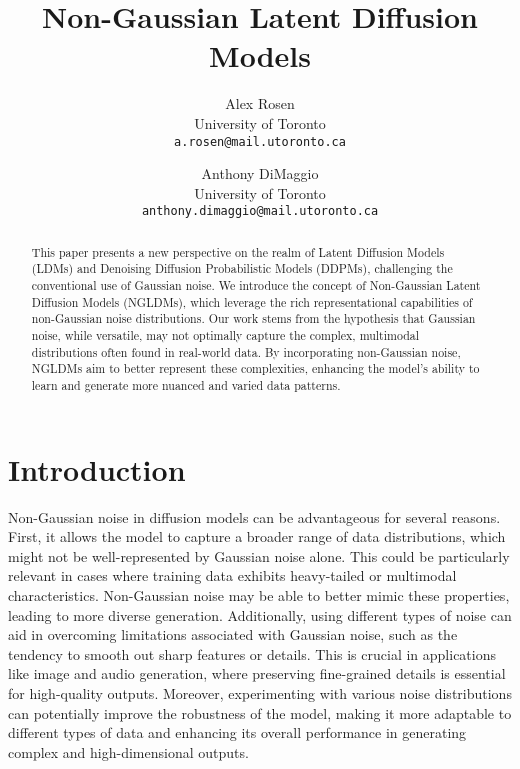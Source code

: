 \documentclass[10pt,twocolumn,letterpaper]{article}
\begin{document}
\title{Non-Gaussian Latent Diffusion Models}

\author{Alex Rosen\\
University of Toronto\\
{\tt\small a.rosen@mail.utoronto.ca}
\and
Anthony DiMaggio\\
University of Toronto\\
{\tt\small anthony.dimaggio@mail.utoronto.ca}
}
\maketitle

\begin{abstract}
   This paper presents a new perspective on the realm of Latent Diffusion Models (LDMs) and Denoising Diffusion Probabilistic Models (DDPMs), challenging the conventional use of Gaussian noise. We introduce the concept of Non-Gaussian Latent Diffusion Models (NGLDMs), which leverage the rich representational capabilities of non-Gaussian noise distributions. Our work stems from the hypothesis that Gaussian noise, while versatile, may not optimally capture the complex, multimodal distributions often found in real-world data. By incorporating non-Gaussian noise, NGLDMs aim to better represent these complexities, enhancing the model's ability to learn and generate more nuanced and varied data patterns.
\end{abstract}

\section{Introduction}
\label{sec:intro}

Non-Gaussian noise in diffusion models can be advantageous for several reasons. First, it allows the model to capture a broader range of data distributions, which might not be well-represented by Gaussian noise alone. This could be particularly relevant in cases where training data exhibits heavy-tailed or multimodal characteristics. Non-Gaussian noise may be able to better mimic these properties, leading to more diverse generation. Additionally, using different types of noise can aid in overcoming limitations associated with Gaussian noise, such as the tendency to smooth out sharp features or details. This is crucial in applications like image and audio generation, where preserving fine-grained details is essential for high-quality outputs. Moreover, experimenting with various noise distributions can potentially improve the robustness of the model, making it more adaptable to different types of data and enhancing its overall performance in generating complex and high-dimensional outputs.
\end{document}
